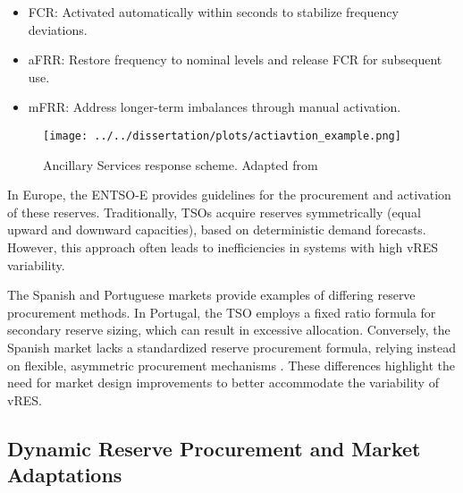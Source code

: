 \begin{itemize}
    \item	\gls{FCR}: Activated automatically within seconds to stabilize frequency deviations.
    \item	\gls{aFRR}: Restore frequency to nominal levels and release FCR for subsequent use.
    \item	\gls{mFRR}: Address longer-term imbalances through manual activation.
\end{itemize}



\begin{figure}[H]
  \centering
  \texttt{[image: ../../dissertation/plots/actiavtion\_example.png]}
  \caption{Ancillary Services response scheme. Adapted from \cite{handbook2009policy}}
  \label{fig:targettimeserieswindows}
\end{figure}

In Europe, the \gls{ENTSO-E} provides guidelines for the procurement and activation of these reserves. Traditionally, \gls{TSO}s acquire reserves symmetrically (equal upward and downward capacities), based on deterministic demand forecasts. However, this approach often leads to inefficiencies in systems with high \gls{vRES} variability. \par

The Spanish and Portuguese markets provide examples of differing reserve procurement methods. In Portugal, the \gls{TSO} employs a fixed ratio formula for secondary reserve sizing, which can result in excessive allocation. Conversely, the Spanish market lacks a standardized reserve procurement formula, relying instead on flexible, asymmetric procurement mechanisms \cite{Frade2019_market}. These differences highlight the need for market design improvements to better accommodate the variability of \gls{vRES}.

\subsection{Dynamic Reserve Procurement and Market Adaptations}

